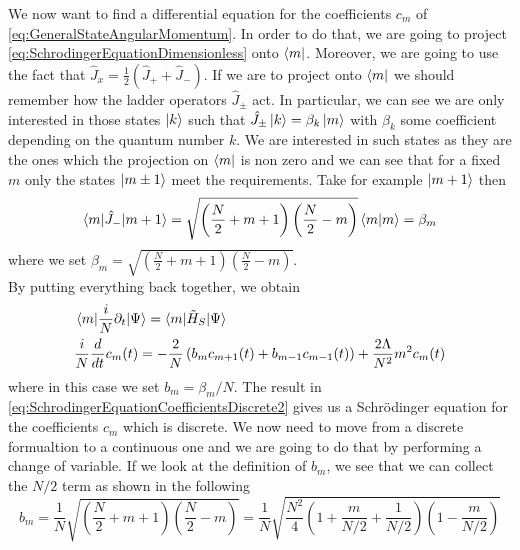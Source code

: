 We now want to find a differential equation for the coefficients $ c_{m} $ of \cref{eq:GeneralStateAngularMomentum}.
In order to do that, we are going to project \cref{eq:SchrodingerEquationDimensionless} onto $ \bra{m} $.
Moreover, we are going to use the fact that $ \hat{J}_x = \frac{1}{2}\left(\hat{J}_{+} + \hat{J}_{-}\right) $.
If we are to project onto $ \bra{m} $ we should remember how the ladder operators $ \hat{J}_{\pm} $ act.
In particular, we can see we are only interested in those states $ \ket{k} $ such that $ \hat{J}_{\pm}\ket{k} = \beta_{k} \ket{m} $ with $ \beta_{k} $ some coefficient depending on the quantum number $ k $.
We are interested in such states as they are the ones which the projection on $ \bra{m} $ is non zero and we can see that for a fixed $ m $   only the states $ \ket{m \pm 1} $ meet the requirements.
Take for example $ \ket{m +1} $ then
\begin{equation}
	\label{eq:LadderOperatorsProjected}
	\braket{m|\hat{J}_{-} |m + 1 } = \sqrt{
		\left(\frac{N}{2} + m +1\right)
		\left(\frac{N}{2} -m\right)
	}
	\braket{m|m}
	=
	\beta_{m}
\end{equation}
where we set $ \beta_{m} =\sqrt {    \left(\frac{N}{2} + m +1\right)  \left(\frac{N}{2} -m\right) }$.\\
By putting everything back together, we obtain
\begin{align}
	 & \braket{m|\frac{i}{N}\partial_t|\Psi} = \braket{m|\tilde{H}_{S}|\Psi}\label{eq:SchrodingerEquationCoefficientsDiscrete1}                                                               \\
	 & \frac{i}{N}\frac{d}{dt}c_{m}(t) =  -\frac{2}{N}\left( b_{m}c_{m+1}(t) + b_{m-1}c_{m-1}(t) \right) + \frac{2\Lambda}{N^2}m^2c_{m}(t)\label{eq:SchrodingerEquationCoefficientsDiscrete2}
\end{align}
where in this case we set $ b_{m} = \beta_m/N $.
The result in \cref{eq:SchrodingerEquationCoefficientsDiscrete2} gives us a Schr{\"o}dinger equation for the coefficients $ c_{m} $ which is discrete. We now need to move from a discrete formualtion to a continuous one and we are going to do that by performing a change of variable.
If we look at the definition of $ b_{m} $, we see that we can collect the $ N/2 $ term as shown in the following
\begin{equation}
	\label{eq:CoefficientCollectingN}
	b_m =\frac{1}{N}\sqrt{
		\left(\frac{N}{2} + m +1\right)  \left(\frac{N}{2} -m\right)
	}  =
	\frac{1}{N}\sqrt{
		\frac{N^2}{4}
		\left(1 + \frac{m}{N/2} +\frac{1}{N/2}\right)
		\left(1 -\frac{m}{N/2}\right)
	}
\end{equation}
